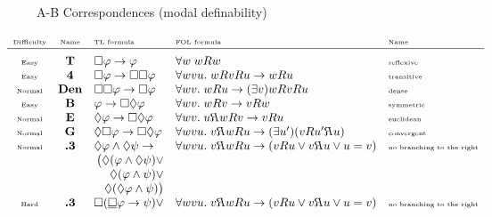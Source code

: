 \documentclass[xcolor=x11names]{beamer}
\newcommand{\lthen}{\rightarrow}
\newcommand{\existsp}[1]{(\exists #1)}
\begin{document}
\begin{frame}
\vspace{-.2cm}
\begin{center}A-B Correspondences (modal definability)\end{center}
\vspace{-.2cm}
\scriptsize
\[\hspace{-.9cm}\begin{array}{cclll}
\rotatebox{0}{\textup{\tiny Difficulty}} & \textup{\tiny Name} & \textup{\tiny TL formula} & \textup{\tiny FOL formula} &\textup{\tiny Name}
\\ \hline
\\[-.7em]  \textup{\tiny Easy}& \textbf {T} & \Box \varphi \lthen \varphi & \forall w \; wRw &\textup{\tiny reflexive}
\\ \textup{\tiny Easy}& \textbf {4} & \Box \varphi \lthen \Box\Box\varphi & \forall {wvu}.\; wRvRu\lthen wRu &\textup{\tiny transitive}
\\ \textup{\tiny Normal}& \textbf {Den} & \Box \Box \varphi \lthen \Box \varphi &\forall {wv} . \; wRu\lthen \existsp v wRvRu &\textup{\tiny dense}
\\ \textup{\tiny Easy}& \textbf {B} & \varphi \lthen \Box \Diamond\varphi &\forall {wv} .\;wRv\lthen vRw &\textup{\tiny symmetric}
\\ \textup{\tiny Normal}& \textbf {E} & \Diamond \varphi \lthen \Box \Diamond\varphi &\forall {wv} .\;u\reflectbox{$R$}wRv\lthen vRu &\textup{\tiny euclidean}
\\ \textup{\tiny Normal}& \textbf {G} & \Diamond \Box \varphi \lthen \Box \Diamond\varphi &\forall {wvu}.\;v\reflectbox {$R$}wRu\lthen  \existsp{u'} (vRu'\reflectbox {$R$}u) &\textup{\tiny convergent}
\\ \textup{\tiny Normal}& \textbf {.3} & \Diamond \varphi \land \Diamond \psi \lthen &\forall {wvu}.\;v\reflectbox {$R$}wRu\lthen (vRu \lor v\reflectbox {$R$}u\lor u=v) &\textup{\tiny no branching to the right}
\\ && \hfill \big(\Diamond (\varphi \land \Diamond\psi) \lor
\\ && \hfill \Diamond (\varphi \land \psi) \lor
\\ && \hfill \Diamond (\Diamond \varphi \land \psi)\big)
\\ \textup{\tiny Hard}& \textbf {.3} & \Box (\underline{\Box} \varphi \lthen \psi)\lor &\forall {wvu}.\;v\reflectbox {$R$}wRu\lthen (vRu \lor v\reflectbox {$R$}u\lor u=v) &\textup{\tiny no branching to the right}

\end{array}\]
\end{frame}
\end{document}
